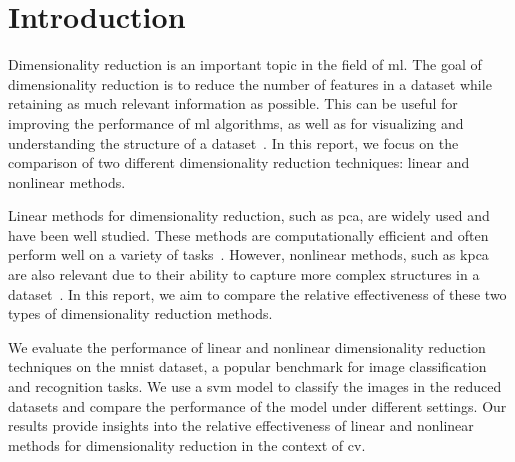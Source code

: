 \chapter{Introduction}\label{cha:introduction}




Dimensionality reduction is an important topic in the field of \gls{ml}. The goal of dimensionality reduction is to reduce the number of features in a dataset while retaining as much relevant information as possible. This can be useful for improving the performance of \gls{ml} algorithms, as well as for visualizing and understanding the structure of a dataset~\cite{dimensionality-reduction-cheng}. In this report, we focus on the comparison of two different dimensionality reduction techniques: linear and nonlinear methods.

Linear methods for dimensionality reduction, such as \gls{pca}, are widely used and have been well studied. These methods are computationally efficient and often perform well on a variety of tasks~\cite{james-statistical-learning1}. However, nonlinear methods, such as \gls{kpca} are also relevant due to  their ability to capture more complex structures in a dataset~\cite{dimensionality-reduction-cheng}. In this report, we aim to compare the relative effectiveness of these two types of dimensionality reduction methods.

We evaluate the performance of linear and nonlinear dimensionality reduction techniques on the \gls{mnist} dataset, a popular benchmark for image classification and recognition tasks. We use a \gls{svm} model to classify the images in the reduced datasets and compare the performance of the model under different settings. Our results provide insights into the relative effectiveness of linear and nonlinear methods for dimensionality reduction in the context of \gls{cv}.

